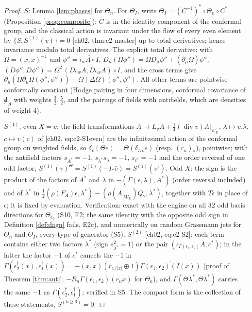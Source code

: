 \documentclass[11pt]{article}
\theoremstyle{definition}
\begin{document}
\begin{proof}
$S$: Lemma \ref{lem:phases} for $\Theta_n$. For $\Theta_I$, write $\Theta_I=(C^{-1})^*\circ\Theta_n\circ C^*$ (Proposition \ref{prop:composite}); $C$ is in the identity component of the conformal group, and the classical action is invariant under the flow of every even element by $\{S,S^{(1)}(v)\}=0$ [ch02, thm:c2-master] up to total derivatives; hence invariance modulo total derivatives. The explicit total derivative: with $\Omega=(x,x)^{-1}$ and $\phi''=\overline{\iota_wA\circ I}$, $D_\mu(\Omega\phi'')=\Omega D_\mu\phi''+(\partial_\mu\Omega)\phi''$, $(D\phi'',D\phi'')=\Omega^2\,\overline{(D\iota_wA,D\iota_wA)}\circ I$, and the cross terms give $\partial_\mu(\Omega\partial_\mu\Omega(\phi'',\phi''))-\Omega(\Delta\Omega)(\phi'',\phi'')$. All other terms are pointwise conformally covariant (Hodge pairing in four dimensions, conformal covariance of ${\not d}_A$ with weights $\frac32,\frac52$, and the pairings of fields with antifields, which are densities of weight $4$).

$S^{(1)}$, even $X=v$: the field transformations $A\mapsto L_vA+\frac14(\operatorname{div}v)A|_{W^\perp_{\mathbb R}}$, $\lambda\mapsto v.\lambda$, $c\mapsto v(c)$ of [ch02, eq:c2-S1even] are the infinitesimal action of the conformal group on weighted fields, so $\delta_v(\Theta e)=\Theta(\delta_{I_*\bar v}e)$ (resp. $(r_n)_*$), pointwise; with the antifield factors $s_{A^*}=-1$, $s_{\lambda^*}s_\lambda=-1$, $s_{c^*}=-1$ and the order reversal of one odd factor, $S^{(1)}(v)^{\Theta}=S^{(1)}(-I_*\bar v)=S^{(1)}(v^\dagger)$. Odd $X$: the sign is the product of the factors of $A^*$ and $\lambda$ in $-(\Gamma(\epsilon,\lambda),A^*)$ (order reversal included) and of $\lambda^*$ in $\frac12(\rho(F_A)\epsilon,\lambda^*)-(\rho(A|_{W^\perp_{\mathbb R}})Q_2,\lambda^*)$, together with $T\epsilon$ in place of $\epsilon$; it is fixed by evaluation. Verification: exact with the engine on all $32$ odd basis directions for $\Theta_{e_0}$ (S10, E2; the same identity with the opposite odd sign in Definition \ref{def:dagn} fails, E2c), and numerically on random Grassmann jets for $\Theta_n$ and $\Theta_I$, every type of generator (S5). $S^{(2)}$ [ch02, eq:c2-S2]: each term contains either two factors $\lambda^*$ (sign $s_{\lambda^*}^2=1$) or the pair $(\iota_{\Gamma(\epsilon_1,\epsilon_2)}A,c^*)$; in the latter the factor $-1$ of $c^*$ cancels the $-1$ in $\Gamma(\epsilon_2^\dagger(x),\epsilon_1^\dagger(x))=-(x,x)(r_{x/|x|}\oplus1)\overline{\Gamma(\epsilon_1,\epsilon_2)(I(x))}$ (proof of Theorem \ref{thm:anti}; $-R_n\overline{\Gamma(\epsilon_1,\epsilon_2)(r_nx)}$ for $\Theta_n$), and $\Gamma(\Theta\lambda^*,\Theta\lambda^*)$ carries the same $-1$ as $\Gamma(\epsilon_2^\dagger,\epsilon_1^\dagger)$; verified in S5. The compact form is the collection of these statements, $S^{(k\ge3)}=0$.
\end{proof}
\end{document}

